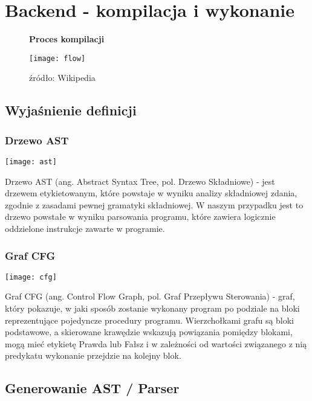 \documentclass[a4paper,twoside,openright,11pt]{report}
\begin{document}
  \chapter {Backend - kompilacja i wykonanie}
  
\begin{figure}[H]
  \centering
  \textbf{Proces kompilacji}\par\medskip
  \texttt{[image: flow]}
  \caption{źródło: Wikipedia}
\end{figure}

  
  \section {Wyjaśnienie definicji}

  \subsection {Drzewo AST}
\begin{center}
  \texttt{[image: ast]}
\end{center}
  
\par Drzewo AST (ang. Abstract Syntax Tree, pol. Drzewo Składniowe) - jest drzewem etykietowanym, które powstaje w wyniku analizy składniowej zdania, zgodnie z zasadami pewnej gramatyki składniowej. W naszym przypadku jest to drzewo powstałe w wyniku parsowania programu, które zawiera logicznie oddzielone instrukcje zawarte w programie.



  \subsection {Graf CFG}
\begin{center}
  \texttt{[image: cfg]}
\end{center}
  
\par Graf CFG (ang. Control Flow Graph, pol. Graf Przepływu Sterowania) - graf, który pokazuje, w jaki sposób zostanie wykonany program po podziale na bloki reprezentujące pojedyncze procedury programu. Wierzchołkami grafu są bloki podstawowe, a skierowane krawędzie wskazują powiązania pomiędzy blokami, mogą mieć etykietę Prawda lub Fałsz i w zależności od wartości związanego z nią predykatu wykonanie przejdzie na kolejny blok.



  \section {Generowanie AST / Parser}
\end{document}
